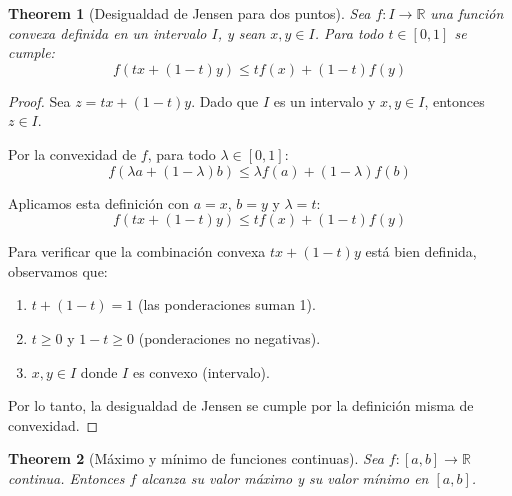 \documentclass[11pt,a4paper]{article}
\theoremstyle{plain}
\newtheorem{theorem}{Theorem}[section]
\theoremstyle{definition}
\begin{document}
\begin{theorem}[Desigualdad de Jensen para dos puntos]
Sea $f: I \to \mathbb{R}$ una función convexa definida en un intervalo $I$, y sean $x, y \in I$. Para todo $t \in [0, 1]$ se cumple:
\[
f(tx + (1-t)y) \leq tf(x) + (1-t)f(y)
\]
\end{theorem}

\begin{proof}
Sea $z = tx + (1-t)y$. Dado que $I$ es un intervalo y $x, y \in I$, entonces $z \in I$.

Por la convexidad de $f$, para todo $\lambda \in [0, 1]$:
\[
f(\lambda a + (1-\lambda)b) \leq \lambda f(a) + (1-\lambda)f(b)
\]

Aplicamos esta definición con $a = x$, $b = y$ y $\lambda = t$:
\[
f(tx + (1-t)y) \leq tf(x) + (1-t)f(y)
\]

Para verificar que la combinación convexa $tx + (1-t)y$ está bien definida, observamos que:
\begin{enumerate}
    \item $t + (1-t) = 1$ (las ponderaciones suman 1).
    \item $t \geq 0$ y $1-t \geq 0$ (ponderaciones no negativas).
    \item $x, y \in I$ donde $I$ es convexo (intervalo).
\end{enumerate}

Por lo tanto, la desigualdad de Jensen se cumple por la definición misma de convexidad.
\end{proof}

\begin{theorem}[Máximo y mínimo de funciones continuas]
Sea $f: [a, b] \to \mathbb{R}$ continua. Entonces $f$ alcanza su valor máximo y su valor mínimo en $[a, b]$.
\end{theorem}
\end{document}
